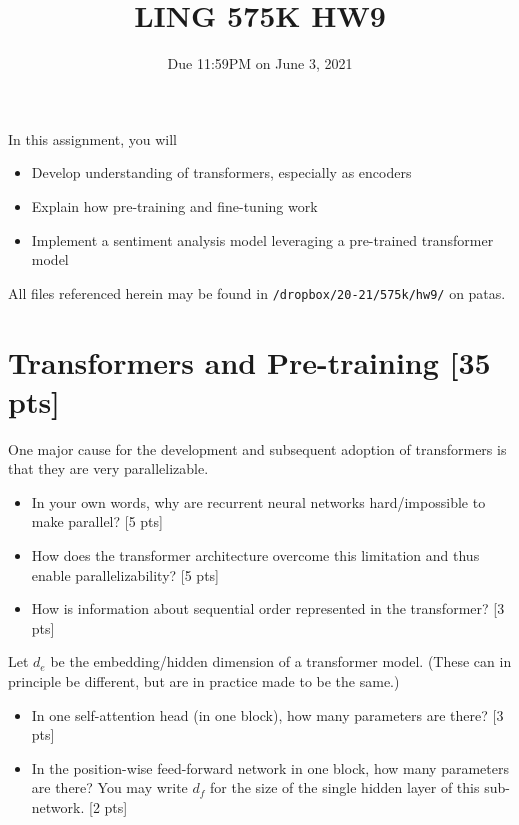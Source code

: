 \documentclass[11pt]{article}
\begin{document}
\title{LING 575K HW9}
\date{\vspace{-0.2in}Due 11:59PM on June 3, 2021}
\maketitle


\noindent In this assignment, you will 
\begin{itemize}
  \item Develop understanding of transformers, especially as encoders
  \item Explain how pre-training and fine-tuning work
  \item Implement a sentiment analysis model leveraging a pre-trained transformer model
\end{itemize}
All files referenced herein may be found in \texttt{/dropbox/20-21/575k/hw9/} on patas.


\section{Transformers and Pre-training [35 pts]}

 One major cause for the development and subsequent adoption of transformers is that they are very parallelizable.
\begin{itemize}
  \item In your own words, why are recurrent neural networks hard/impossible to make parallel? \hfill [5 pts]
  \item How does the transformer architecture overcome this limitation and thus enable parallelizability? \hfill [5 pts]
  \item How is information about sequential order represented in the transformer? \hfill [3 pts]
\end{itemize}

\vspace{2em}
 Let $d_e$ be the embedding/hidden dimension of a transformer model.  (These can in principle be different, but are in practice made to be the same.)
\begin{itemize}
  \item In one self-attention head (in one block), how many parameters are there? \hfill [3 pts]
  \item In the position-wise feed-forward network in one block, how many parameters are there? You may write $d_f$ for the size of the single hidden layer of this sub-network. \hfill [2 pts]
\end{itemize}
\end{document}
